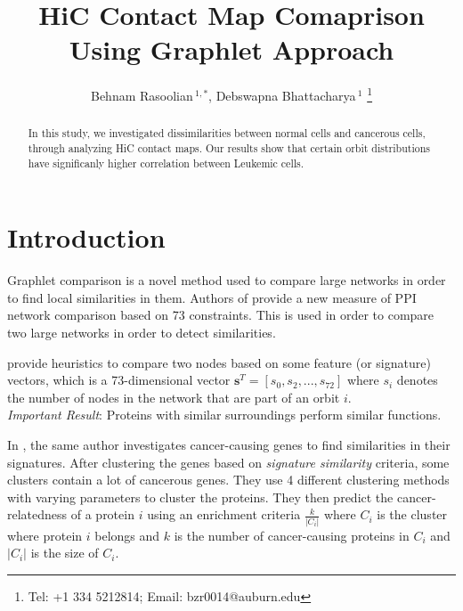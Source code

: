\documentclass[a4,center,fleqn]{NAR}
\begin{document}
\title{HiC Contact Map Comaprison Using Graphlet Approach}

\author{%
    Behnam Rasoolian\,$^{1,*}$,
    Debswapna Bhattacharya\,$^{1}$
    \footnote{
    Tel: +1 334 5212814; Email: bzr0014@auburn.edu}}

    \address{%
        $^{1}$ Auburn University
        }


            \maketitle

\begin{abstract}

In this study, we investigated
dissimilarities between normal cells and cancerous cells,
through analyzing HiC contact maps. 
Our results show that certain orbit distributions
have significanly higher correlation 
between Leukemic cells.

\end{abstract}

\section{Introduction}

Graphlet comparison is a novel method used to compare large networks in order to
find local similarities in them.
Authors of \cite{prvzulj2007biological} provide a new measure of PPI
network comparison
based on 73 constraints. This is used in order to compare two large
networks in order to detect similarities.

\cite{milenkoviae2008uncovering} 
 provide heuristics to compare two nodes based on some feature
(or signature) vectors, which is a 73-dimensional vector
$\mathbf{s}^T
= [s_0, s_2, ..., s_{72}]$ where $s_i$ denotes the number of nodes in
the network that are part of an orbit $i$. \\
\textit{Important Result}: Proteins with similar surroundings perform
similar functions.

In \cite{milenkovic2010cancer}, the same author investigates 
cancer-causing genes to find similarities in their signatures. After
clustering the genes based on \textit{signature similarity} criteria,
some clusters contain a lot of cancerous genes.
They use 4 different clustering methods with varying parameters to cluster
the proteins. They then predict the cancer-relatedness of a protein 
$i$ using
an enrichment criteria $\frac{k}{|C_i|}$ where $C_i$ is the cluster
where protein $i$ belongs and $k$ is the number of cancer-causing
proteins in $C_i$ and $|C_i|$ is the size of $C_i$.
\end{document}
